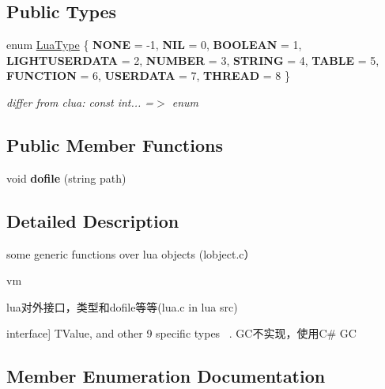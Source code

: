 \subsection*{Public Types}
\begin{DoxyCompactItemize}
\item 
enum \mbox{\hyperlink{classzlua_1_1_lua_a3bea46ecc2aabf23ac160bd7e7172e70}{Lua\+Type}} \{ \newline
{\bfseries N\+O\+NE} = -\/1, 
{\bfseries N\+IL} = 0, 
{\bfseries B\+O\+O\+L\+E\+AN} = 1, 
{\bfseries L\+I\+G\+H\+T\+U\+S\+E\+R\+D\+A\+TA} = 2, 
\newline
{\bfseries N\+U\+M\+B\+ER} = 3, 
{\bfseries S\+T\+R\+I\+NG} = 4, 
{\bfseries T\+A\+B\+LE} = 5, 
{\bfseries F\+U\+N\+C\+T\+I\+ON} = 6, 
\newline
{\bfseries U\+S\+E\+R\+D\+A\+TA} = 7, 
{\bfseries T\+H\+R\+E\+AD} = 8
 \}
\begin{DoxyCompactList}\small\item\em differ from clua\+: const int... =$>$ enum \end{DoxyCompactList}\end{DoxyCompactItemize}
\subsection*{Public Member Functions}
\begin{DoxyCompactItemize}
\item 
\mbox{\label{classzlua_1_1_lua_a8d69f72236b14935e2f4da7360dfc00f}} 
void {\bfseries dofile} (string path)
\end{DoxyCompactItemize}


\subsection{Detailed Description}
some generic functions over lua objects (lobject.\+c） 

vm 

lua对外接口，类型和dofile等等(lua.\+c in lua src) 


\begin{DoxyEnumerate}
\item interface\mbox{]} T\+Value, and other 9 specific types ~. G\+C不实现，使用C\# GC 
\end{DoxyEnumerate}

\subsection{Member Enumeration Documentation}
\mbox{\label{classzlua_1_1_lua_a3bea46ecc2aabf23ac160bd7e7172e70}} 

